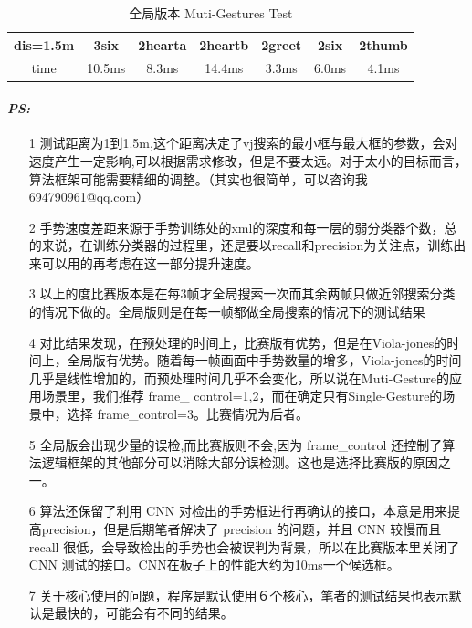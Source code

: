 \documentclass{article}
\begin{document}
	\begin{table}[htb]
		\centering
  		\begin{tabulary}{0.95\textwidth}{CCCCCCC}
  		dis=1.5m & 3six& 2hearta&2heartb&2greet&2six&2thumb \\
    	\hline 
		 time  & 10.5ms & 8.3ms & 14.4ms & 3.3ms & 6.0ms & 4.1ms\\
  		\end{tabulary}  
  		\caption{全局版本 Muti-Gestures Test}
		\label{tab:Margin_settings}
	\end{table}


\newpage
\paragraph{\emph{PS:}}
	\begin{itemize}
	\item[1] 测试距离为1到1.5m,这个距离决定了vj搜索的最小框与最大框的参数，会对速度产生一定影响,可以根据需求修改，但是不要太远。对于太小的目标而言，算法框架可能需要精细的调整。（其实也很简单，可以咨询我694790961@qq.com）
	\item[2] 手势速度差距来源于手势训练处的xml的深度和每一层的弱分类器个数，总的来说，在训练分类器的过程里，还是要以recall和precision为关注点，训练出来可以用的再考虑在这一部分提升速度。
	\item[3] 以上的度比赛版本是在每3帧才全局搜索一次而其余两帧只做近邻搜索分类的情况下做的。全局版则是在每一帧都做全局搜索的情况下的测试结果
	\item[4] 对比结果发现，在预处理的时间上，比赛版有优势，但是在Viola-jones的时间上，全局版有优势。随着每一帧画面中手势数量的增多，Viola-jones的时间几乎是线性增加的，而预处理时间几乎不会变化，所以说在Muti-Gesture的应用场景里，我们推荐 frame\_ control=1,2，而在确定只有Single-Gesture的场景中，选择  frame\_control=3。比赛情况为后者。
	\item[5] 全局版会出现少量的误检,而比赛版则不会,因为 frame\_control 还控制了算法逻辑框架的其他部分可以消除大部分误检测。这也是选择比赛版的原因之一。
	\item[6] 算法还保留了利用 CNN 对检出的手势框进行再确认的接口，本意是用来提高precision，但是后期笔者解决了 precision 的问题，并且 CNN 较慢而且 recall 很低，会导致检出的手势也会被误判为背景，所以在比赛版本里关闭了 CNN 测试的接口。CNN在板子上的性能大约为10ms一个候选框。
	\item[7] 关于核心使用的问题，程序是默认使用６个核心，笔者的测试结果也表示默认是最快的，可能会有不同的结果。
	\end{itemize}
\end{document}

